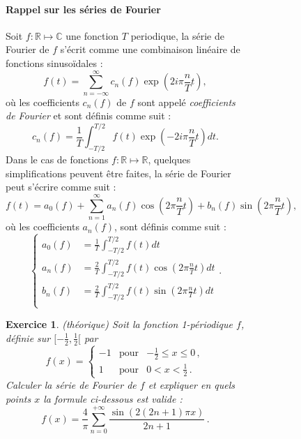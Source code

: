 \documentclass[a4paper,11pt]{article}
\newtheorem{exo}{Exercice}
\begin{document}
\begin{figure}
\begin{figure}
\paragraph*{Rappel sur les séries de Fourier}
Soit $f:\mathbb{R}\mapsto\mathbb{C}$ une fonction $T$ periodique, la série
de Fourier de $f$ s'écrit comme une combinaison linéaire de fonctions sinusoïdales :
\begin{equation}
	f(t) = \sum_{n=-\infty}^{\infty} c_{n}(f)\exp\left(2i\pi\frac{n}{T}t\right),
\end{equation}
où les coefficients $c_{n}(f)$ de $f$ sont appelé \emph{coefficients de Fourier}
et sont définis comme suit :
\begin{equation}
	c_{n}(f) = \frac{1}{T}\int_{-T/2}^{T/2} f(t)\exp\left(-2i\pi\frac{n}{T}t\right)dt.
\end{equation}
Dans le cas de fonctions $f:\mathbb{R}\mapsto\mathbb{R}$, quelques simplifications
peuvent être faites, la série de Fourier peut s'écrire comme suit :
\begin{equation}
	f(t) = a_{0}(f) + \sum_{n=1}^{\infty} a_{n}(f)\cos\left(2\pi\frac{n}{T}t\right) + b_{n}(f)\sin\left(2\pi\frac{n}{T}t\right),
\end{equation}
où les coefficients $a_{n}(f)$, sont définis comme suit :
\begin{equation}
	\left\{\begin{aligned}
		a_{0}(f) &= \frac{1}{T}\int_{-T/2}^{T/2}f(t)dt \\
		a_{n}(f) &= \frac{2}{T}\int_{-T/2}^{T/2}f(t)\cos\left(2\pi\frac{n}{T}t\right)dt \\
		b_{n}(f) &= \frac{2}{T}\int_{-T/2}^{T/2}f(t)\sin\left(2\pi\frac{n}{T}t\right)dt \\
	\end{aligned}\right..
\end{equation}

\begin{exo} (théorique) Soit la fonction 1-périodique $f$, définie
  sur $[-\frac{1}{2}, \frac{1}{2}[$ par
  \begin{equation}
    \label{f}
    f(x) = \left\{\begin{array}{lll}
        -1 & \text{pour} & -\frac{1}{2} \le x \le 0 \,,\\
        1 & \text{pour} & 0< x < \frac{1}{2} \,.
      \end{array}\right.
  \end{equation}
  Calculer la série de Fourier de $f$ et expliquer en
  quels points $x$ la formule ci-dessous est valide :
  \begin{equation}
    \label{Ff}
    f(x) = \frac{4}{\pi} \sum_{n=0}^{+\infty} \frac{\sin(2(2n+1)\pi x)}{2n+1} \,.
  \end{equation}
\end{exo}


\end{figure}
\end{figure}
\end{document}
